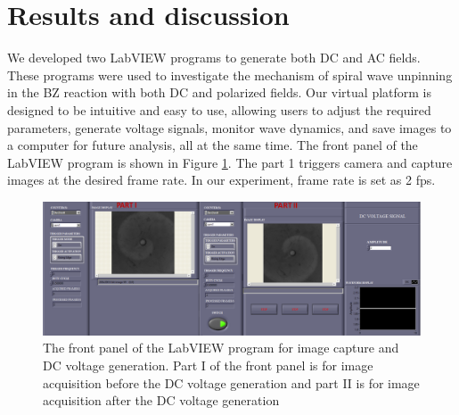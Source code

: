 \documentclass[journal=jacsat,manuscript=article]{achemso}
\begin{document}
\section{Results and discussion}
We developed two LabVIEW programs to generate both DC and AC
fields. These programs were used to investigate the mechanism of
spiral wave unpinning in the BZ reaction with both DC and polarized
fields.  Our virtual platform is designed to be
intuitive and easy to use, allowing users to adjust the required
parameters, generate voltage signals, monitor wave dynamics, and save
images to a computer for future analysis, all at the same time.
The front panel of the LabVIEW program is shown in Figure
\ref{fig:ex3}.
The part 1 triggers camera and capture images at the desired frame rate.
In our experiment, frame rate is set as 2 fps. 
\begin{figure}[H]
    \centering
\includegraphics[width=\linewidth,height=0.6\linewidth]{Dc_frntpnl - Copy.png}
    \caption{The front panel of the LabVIEW program for image capture
      and DC voltage generation. Part I of the front panel is for
      image acquisition before the DC voltage generation and part II
      is for image acquisition after the DC voltage generation}
    \label{fig:ex3}
\end{figure}

\end{document}
